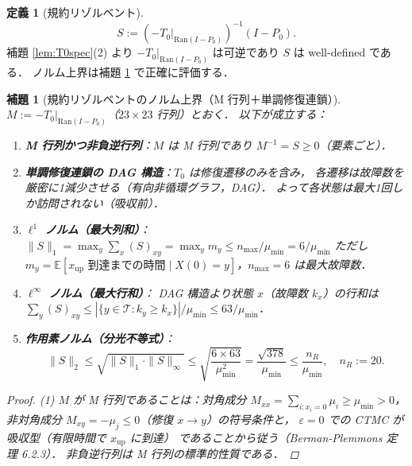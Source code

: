 \documentclass[12pt,a4paper]{article}
\theoremstyle{plain}
\newtheorem{lemma}[theorem]{補題}
\theoremstyle{definition}
\newtheorem{definition}[theorem]{定義}
\theoremstyle{remark}
\newcommand{\bE}{\mathbb{E}}
\newcommand{\calT}{\mathcal{T}}
\newcommand{\eps}{\varepsilon}
\newcommand{\RedRes}{S}
\newcommand{\Proj}{P}
\begin{document}
\begin{definition}[規約リゾルベント]\label{def:riesz}
  \begin{equation}
    \RedRes := (-T_0|_{\mathrm{Ran}(I-\Proj_0)})^{-1}(I-\Proj_0).
  \end{equation}
  補題 \ref{lem:T0spec}(2) より $-T_0|_{\mathrm{Ran}(I-\Proj_0)}$ は可逆であり
  $\RedRes$ は well-defined である．
  ノルム上界は補題 \ref{lem:resolvnorm} で正確に評価する．
\end{definition}

\begin{lemma}[規約リゾルベントのノルム上界（M 行列＋単調修復連鎖）]\label{lem:resolvnorm}
  $M := -T_0|_{\mathrm{Ran}(I-\Proj_0)}$（$23\times23$ 行列）とおく．
  以下が成立する：
  \begin{enumerate}[label=(\arabic*)]
    \item \textbf{M 行列かつ非負逆行列}：$M$ は M 行列であり $M^{-1}=\RedRes\ge0$（要素ごと）．
    \item \textbf{単調修復連鎖の DAG 構造}：$T_0$ は修復遷移のみを含み，
          各遷移は故障数を厳密に1減少させる（有向非循環グラフ，DAG）．
          よって各状態は最大1回しか訪問されない（吸収前）．
    \item \textbf{$\ell^1$ ノルム（最大列和）}：
          $\|\RedRes\|_1 = \max_{y} \sum_{x}(\RedRes)_{xy} = \max_y m_y \le n_{\max}/\mu_{\min} = 6/\mu_{\min}$
          ただし $m_y = \bE[\text{$x_{\mathrm{up}}$ 到達までの時間} \mid X(0)=y]$，$n_{\max}=6$ は最大故障数．
    \item \textbf{$\ell^\infty$ ノルム（最大行和）}：
          DAG 構造より状態 $x$（故障数 $k_x$）の行和は
          $\sum_y(\RedRes)_{xy}\le|\{y\in\calT:k_y\ge k_x\}|/\mu_{\min}\le63/\mu_{\min}$．
    \item \textbf{作用素ノルム（分光不等式）}：
          \begin{equation}\label{eq:resolvbound}
            \|\RedRes\|_2 \le \sqrt{\|\RedRes\|_1\cdot\|\RedRes\|_\infty}
            \le \sqrt{\frac{6\times63}{\mu_{\min}^2}}
            = \frac{\sqrt{378}}{\mu_{\min}}
            \le \frac{n_R}{\mu_{\min}}, \quad n_R := 20.
          \end{equation}
  \end{enumerate}

  \begin{proof}
    (1) $M$ が M 行列であることは：対角成分 $M_{xx}=\sum_{i:x_i=0}\mu_i\ge\mu_{\min}>0$，
    非対角成分 $M_{xy}=-\mu_j\le0$（修復 $x\to y$）の符号条件と，
    $\eps=0$ での CTMC が吸収型（有限時間で $x_{\mathrm{up}}$ に到達）
    であることから従う（Berman-Plemmons \cite{bermanplemmons1994} 定理 6.2.3）．
    非負逆行列は M 行列の標準的性質である．


\end{proof}
\end{lemma}
\end{document}
